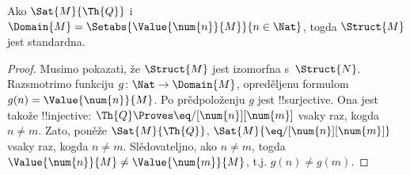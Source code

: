 \documentclass[../../../include/open-logic-section]{subfiles}
\begin{document}
\begin{prop}
Ako $\Sat{M}{\Th{Q}}$ i $\Domain{M} =
\Setabs{\Value{\num{n}}{M}}{n \in \Nat}$, togda $\Struct{M}$ jest
standardna.
\end{prop}

\begin{proof}
Musimo pokazati, že $\Struct{M}$ jest izomorfna
s~$\Struct{N}$. Razsmotrimo funkciju $g\colon \Nat \to \Domain{M}$,
opreděljenu formulom $g(n) = \Value{\num{n}}{M}$. Po prědpoloženju
$g$ jest !!{surjective}. Ona jest takože !!{injective}: $\Th{Q}
\Proves \eq/[\num{n}][\num{m}]$ vsaky raz, kogda $n \neq m$. Zato,
poněže $\Sat{M}{\Th{Q}}$, $\Sat{M}{\eq/[\num{n}][\num{m}]}$ vsaky
raz, kogda $n \neq m$. Slědovateljno, ako $n \neq m$, togda
$\Value{\num{n}}{M} \neq \Value{\num{m}}{M}$, t.j. $g(n) \neq g(m)$.


\end{proof}
\end{document}
